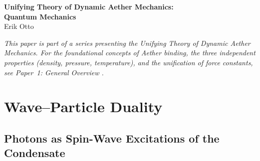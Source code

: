 ﻿\documentclass[12pt,letterpaper]{article}
\begin{document}
\begin{center}
{\LARGE\bfseries Unifying Theory of Dynamic Aether Mechanics:\\
Quantum Mechanics}\\[1em]
{\large Erik Otto}
\end{center}

\vspace{1em}

\begin{abstract}
Within the Dynamic Aether Mechanics framework, quantum phenomena emerge from
the properties of a quantum superfluid with a logarithmic equation of state.  This
paper derives wave--particle duality from extended condensate excitations (photons
as spin-wave modes of the spinor condensate, with Derrick's theorem forbidding
stable localized particles in free space) that condense near matter via the Dynamic
Casimir Effect.  Energy quantization arises from angular phase-matching conditions
in the atomic resonant cavity formed by the nuclear flow gradient, reproducing
the hydrogen energy levels $E_n = -13.6/n^2$~eV and all spectral series.  The Pauli
exclusion principle follows from topological vortex interactions: same-circulation
vortices cannot share a spatial mode because their superposed velocity fields
carry divergent energy.  The Schr\"odinger equation is recovered via the Madelung
inverse construction with Wallstrom's topological quantization condition resolved
by the quantized circulation of the medium.  The electron is identified as a
quantized vortex ring with mass determined by $m_e c^2 = \tfrac{1}{2}\rho_A
\kappa_e^2 r_{\mathrm{loop}} [\ln(8r_{\mathrm{loop}}/\xi) - \tfrac{1}{2}]$.
\end{abstract}

\vspace{1em}

\bigskip
\noindent\textit{This paper is part of a series presenting the Unifying Theory of
Dynamic Aether Mechanics.  For the foundational concepts of Aether binding,
the three independent properties (density, pressure, temperature), and the
unification of force constants, see Paper~1: General Overview \cite{otto-overview}.}
\bigskip

\section{Wave--Particle Duality}

\subsection{Photons as Spin-Wave Excitations of the Condensate}
\end{document}

